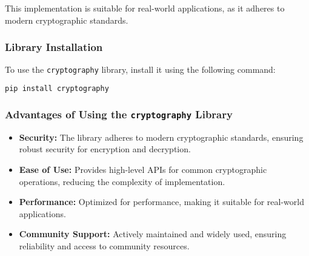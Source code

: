 \documentclass[12pt,a4paper]{report}
\begin{document}
This implementation is suitable for real-world applications, as it adheres to modern cryptographic standards.

\subsubsection{Library Installation}
To use the \texttt{cryptography} library, install it using the following command:
\begin{lstlisting}[language=bash]
pip install cryptography
\end{lstlisting}

\subsubsection{Advantages of Using the \texttt{cryptography} Library}
\begin{itemize}
    \item \textbf{Security:} The library adheres to modern cryptographic standards, ensuring robust security for encryption and decryption.
    \item \textbf{Ease of Use:} Provides high-level APIs for common cryptographic operations, reducing the complexity of implementation.
    \item \textbf{Performance:} Optimized for performance, making it suitable for real-world applications.
    \item \textbf{Community Support:} Actively maintained and widely used, ensuring reliability and access to community resources.
\end{itemize}
\end{document}
